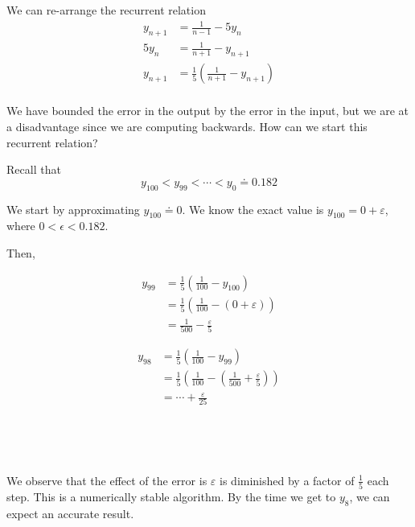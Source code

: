 \begin{example}[Cont.]
    We can re-arrange the recurrent relation
    \begin{align*}
        y_{n+1}
         & = \frac{1}{n-1} - 5y_n                               \\
        5y_n
         & = \frac{1}{n+1} - y_{n+1}                            \\
        y_{n+1}
         & = \frac{1}{5} \left( \frac{1}{n+1} - y_{n+1} \right) \\
    \end{align*}

    We have bounded the error in the output by the error in the input, but we are at a disadvantage since we are computing backwards. How can we start this recurrent relation?

    Recall that \[
        y_{100} < y_{99} < \cdots < y_0 \doteq 0.182
    \]

    We start by approximating \( y_{100} \doteq 0 \). We know the exact value is \( y_{100} = 0 + \varepsilon \), where \( 0 < \epsilon < 0.182 \).

    Then,
    \begin{minipage}[t]{0.45\linewidth}
        \begin{align*}
            y_{99}
             & = \frac{1}{5} \left( \frac{1}{100} - y_{100} \right)            \\
             & = \frac{1}{5} \left( \frac{1}{100} - (0 + \varepsilon ) \right) \\
             & = \frac{1}{500} - \frac{\varepsilon}{5}
        \end{align*}
    \end{minipage}
    \begin{minipage}[t]{0.45\linewidth}
        \begin{align*}
            y_{98}
             & = \frac{1}{5} \left( \frac{1}{100} - y_{99} \right)                                              \\
             & = \frac{1}{5} \left( \frac{1}{100} - \left(\frac{1}{500} + \frac{\varepsilon}{5} \right) \right) \\
             & = \cdots + \frac{\varepsilon}{25}
        \end{align*}
    \end{minipage}

    {~~~}

    {~~~}

    We observe that the effect of the error is \( \varepsilon \) is diminished by a factor of \( \frac{1}{5} \) each step. This is a numerically stable algorithm. By the time we get to \( y_8 \), we can expect an accurate result.
\end{example}


